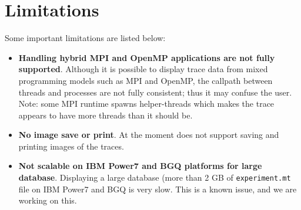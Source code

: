


\section{Limitations}

Some important \hpctraceviewer{} limitations are listed below:
\begin{itemize}

\item \textbf{Handling hybrid MPI and OpenMP applications are not fully supported}.
	Although it is possible to display trace data from mixed programming models such as MPI and OpenMP, the callpath between threads and processes are not fully consistent; thus it may confuse the user. Note: some MPI runtime spawns helper-threads which makes the trace appears to have more threads than it should be.

\item \textbf{No image save or print}.
	At the moment \hpctraceviewer{} does not support saving and printing images of the traces.

\item \textbf{Not scalable on IBM Power7 and BGQ platforms for large database}.
	Displaying a large database (more than 2 GB of \texttt{experiment.mt} file on IBM Power7 and BGQ is very slow. This is a known issue, and we are working on this.


\end{itemize}
